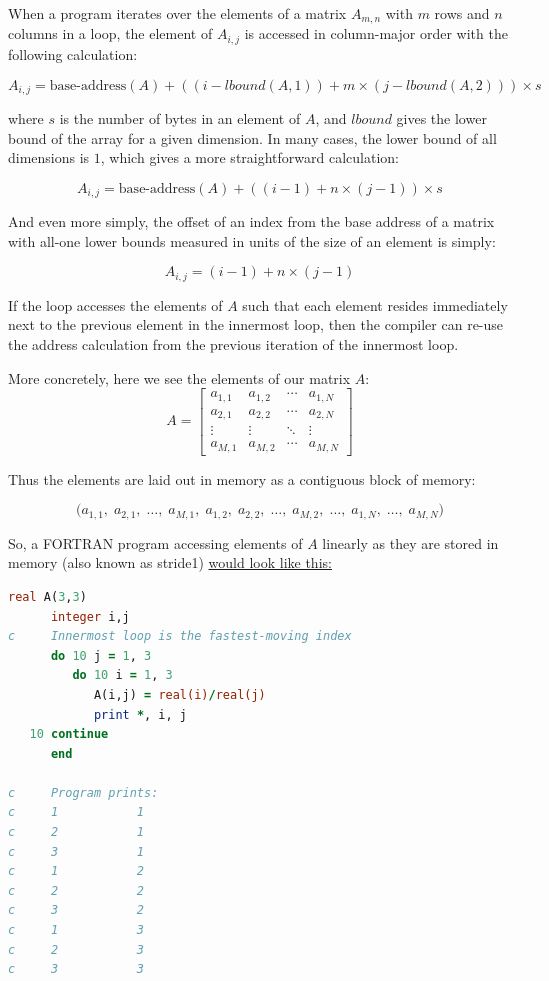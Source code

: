 When a program iterates over the elements of a matrix $A_{m, n}$ with $m$ rows and $n$ columns in a loop,
the element of $A_{i, j}$ is accessed in column-major order with the following calculation:

\[
	A_{i, j} = \text{base-address}(A) + ((i - lbound(A, 1)) + m \times (j - lbound(A, 2))) \times s
\]

where $s$ is the number of bytes in an element of $A$, and $lbound$ gives the lower bound of the array
for a given dimension.
In many cases, the lower bound of all dimensions is $1$, which gives a more straightforward calculation:

\[
	A_{i, j} = \text{base-address}(A) + ((i - 1) + n \times (j - 1)) \times s
\]

And even more simply, the offset of an index from the base address of a matrix
with all-one lower bounds measured in units of the size of an element is simply:

\[
	A_{i, j} = (i - 1) + n \times (j - 1)
\]

If the loop accesses the elements of $A$ such that each element resides immediately next to the previous
element in the innermost loop, then the compiler can re-use the address calculation from the previous
iteration of the innermost loop.

More concretely, here we see the elements of our matrix $A$:
\[
	A =
	\begin{bmatrix}
		a_{1,1} & a_{1,2} & \cdots & a_{1,N} \\
		a_{2,1} & a_{2,2} & \cdots & a_{2,N} \\
		\vdots  & \vdots  & \ddots & \vdots  \\
		a_{M,1} & a_{M,2} & \cdots & a_{M,N}
	\end{bmatrix}
\]

Thus the elements are laid out in memory as a contiguous block of memory:

\[
	\big(
	a_{1,1},\; a_{2,1},\; \dots,\; a_{M,1},\;
	a_{1,2},\; a_{2,2},\; \dots,\; a_{M,2},\;
	\ldots,\;
	a_{1,N},\; \dots,\; a_{M,N}
	\big)
\]

So, a FORTRAN program accessing elements of $A$ linearly as they
are stored in memory (also known as \gls{stride1})
\href{https://godbolt.org/z/T6M4dvMP4}{would look like this:}

\begin{lstlisting}[language=Fortran,frame=single]
      real A(3,3)
      integer i,j
c     Innermost loop is the fastest-moving index
      do 10 j = 1, 3
         do 10 i = 1, 3
            A(i,j) = real(i)/real(j)
            print *, i, j
   10 continue
      end

c     Program prints:
c     1           1
c     2           1
c     3           1
c     1           2
c     2           2
c     3           2
c     1           3
c     2           3
c     3           3
\end{lstlisting}

